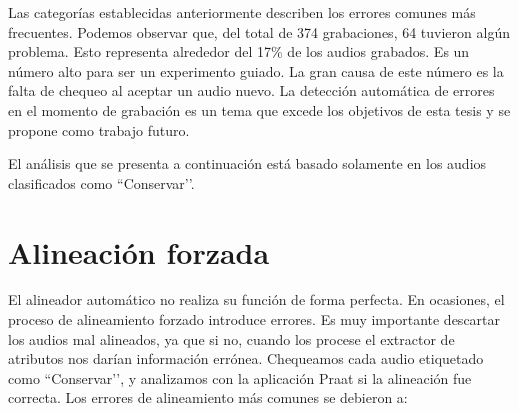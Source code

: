 Las categorías establecidas anteriormente describen los errores comunes más frecuentes. Podemos observar que, del total de 374 grabaciones, 64 tuvieron algún problema. Esto representa alrededor del 17\% de los audios grabados. Es un número alto para ser un experimento guiado. La gran causa de este número es la falta de chequeo al aceptar un audio nuevo. La detección automática de errores en el momento de grabación es un tema que excede los objetivos de esta tesis y se propone como trabajo futuro.

El análisis que se presenta a continuación está basado solamente en los audios clasificados como ``Conservar’’.

\section{Alineación forzada}

El alineador automático no realiza su función de forma perfecta. En ocasiones, el proceso de alineamiento forzado introduce errores. Es muy importante descartar los audios mal alineados, ya que si no, cuando los procese el extractor de atributos nos darían información errónea. Chequeamos cada audio etiquetado como ``Conservar’’, y analizamos con la aplicación Praat \cite{praat} si la alineación fue correcta. Los errores de alineamiento más comunes se debieron a:

